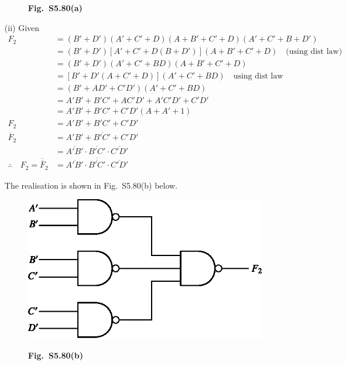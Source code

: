 \begin{solution}
\begin{itemize}
\begin{figure}[H]
\smallskip
{\bf Fig.~S5.80(a)}
\end{figure}

\item[(ii)] Given
\begin{align*}
F_{2} &= (B'+D')(A'+C'+D)(A+B'+C'+D)(A'+C'+B+D')\\[6pt]
     &= (B'+D')[A'+C'+D(B+D')](A+B'+C'+D)\quad \text{(using dist law)}\\[6pt]
&= (B'+D')(A'+C'+BD)(A+B'+C'+D)\\[6pt]
&= [B'+D'(A+C'+D)](A'+C'+BD)\quad\text{using dist law}\\[6pt]
&= (B'+AD'+C'D')(A'+C'+BD)\\[6pt]
&= A'B'+B'C'+AC'D'+A'C'D'+C'D'\\[6pt]
&= A'B'+B'C'+C'D'(A+A'+1)\\[6pt]
F_{2} &= A'B'+B'C'+C'D'\\[6pt]
\overline{F}_{2} &= \overline{A'B'+B'C'+C'D'}\\[6pt]
 &= \overline{A'B'}\cdot \overline{B'C'}\cdot \overline{C'D'}\\[6pt]
\therefore\quad F_{2}=\overline{\overline{F}}_{2} &= \overline{\overline{A'B'}\cdot \overline{B'C'}\cdot \overline{C'D'}}
\end{align*}

\eject

The realisation is shown in Fig.~S5.80(b) below.
\begin{figure}[H]
\centering
\includegraphics{chap5/figS10.eps}

\smallskip
{\bf Fig.~S5.80(b)}
\end{figure}
\end{itemize}
\end{solution}


